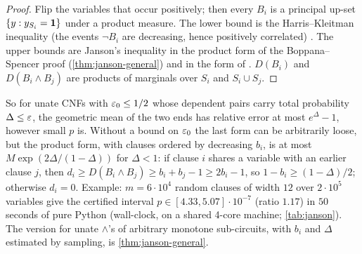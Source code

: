 \begin{proof}
Flip the variables that occur positively; then every $B_i$ is a principal up-set
$\{y:y_{S_i}=\mathbf{1}\}$ under a product measure. The lower bound is the
Harris--Kleitman inequality (the events $\neg B_i$ are decreasing, hence positively
correlated) \cite{harris1960}. The upper bounds are Janson's inequality
\cite{janson1990} in the product form of the Boppana--Spencer proof
(\cref{thm:janson-general}) and in the form of \cite[Thm.~8.1.1]{alonspencer}.
$D(B_i)$ and $D(B_i\wedge B_j)$ are products of marginals over $S_i$ and
$S_i\cup S_j$.
\end{proof}

So for unate CNFs with $\varepsilon_0\le1/2$ whose dependent pairs carry total probability
$\Delta\le\varepsilon$, the geometric mean of the two ends has relative error at most
$e^{\Delta}-1$, however small $p$ is. Without a bound on $\varepsilon_0$ the last form can
be arbitrarily loose, but the product form, with clauses ordered by decreasing
$b_i$, is at most $M\exp(2\Delta/(1-\Delta))$ for $\Delta<1$: if clause $i$ shares a
variable with an earlier clause $j$, then $d_i\ge D(B_i\wedge B_j)\ge b_i+b_j-1\ge
2b_i-1$, so $1-b_i\ge(1-\Delta)/2$; otherwise $d_i=0$. Example: $m=6\cdot10^4$
random clauses of width $12$ over $2\cdot10^5$ variables give the certified interval
$p\in[4.33,5.07]\cdot10^{-7}$ (ratio $1.17$) in $50$ seconds of pure Python
(wall-clock, on a shared 4-core machine; \cref{tab:janson}). The
version for unate $\wedge$'s of arbitrary monotone sub-circuits, with $b_i$ and
$\Delta$ estimated by sampling, is \cref{thm:janson-general}.
